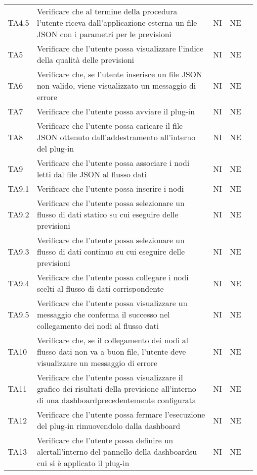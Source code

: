 \begin{longtable} {
		>{}p{15mm} 
		>{}p{79.5mm}
		>{}p{15mm} 
		>{}p{15mm}
		>{}p{0mm}}
	TA4.5 & Verificare che al termine della procedura l'utente riceva dall'applicazione esterna un file JSON con i parametri per le previsioni & NI & NE  &\TBstrut \\ [2mm]
	TA5 & Verificare che l'utente possa visualizzare l'indice della qualità delle previsioni & NI & NE  &\TBstrut \\ [2mm]
	TA6 & Verificare che, se l'utente inserisce un file JSON non valido, viene visualizzato un messaggio di errore & NI & NE  &\TBstrut \\ [2mm]
	TA7 & Verificare che l'utente possa avviare il plug-in & NI & NE  &\TBstrut \\ [2mm]
	TA8 & Verificare che l'utente possa caricare il file JSON ottenuto dall'addestramento all'interno del plug-in & NI & NE  &\TBstrut \\ [2mm]
	TA9 & Verificare che l'utente possa associare i nodi letti dal file JSON al flusso dati & NI & NE  &\TBstrut \\ [2mm]
	TA9.1 & Verificare che l'utente possa inserire i nodi & NI & NE  &\TBstrut \\ [2mm]
	TA9.2 & Verificare che l'utente possa selezionare un flusso di dati statico su cui eseguire delle previsioni & NI & NE  &\TBstrut \\ [2mm]
	TA9.3 & Verificare che l'utente possa selezionare un flusso di dati continuo su cui eseguire delle previsioni & NI & NE  &\TBstrut \\ [2mm]
	TA9.4 & Verificare che l'utente possa collegare i nodi scelti al flusso di dati corrispondente & NI & NE  &\TBstrut \\ [2mm]
	TA9.5 & Verificare che l'utente possa visualizzare un messaggio che conferma il successo nel collegamento dei nodi al flusso dati & NI & NE  &\TBstrut \\ [2mm]
	TA10 & Verificare che, se il collegamento dei nodi al flusso dati non va a buon file, l'utente deve visualizzare un messaggio di errore & NI & NE  &\TBstrut \\ [2mm]
	TA11 & Verificare che l'utente possa visualizzare il grafico dei risultati della previsione all'interno di una dashboard\glosp precedentemente configurata & NI & NE  &\TBstrut \\ [2mm]
	TA12 & Verificare che l'utente possa fermare l'esecuzione del plug-in rimuovendolo dalla dashboard\glo & NI & NE  &\TBstrut \\ [2mm]
	TA13 & Verificare che l'utente possa definire un alert\glosp all'interno del pannello della dashboard\glosp su cui si è applicato il plug-in & NI & NE  &\TBstrut \\ [2mm]

\end{longtable}
